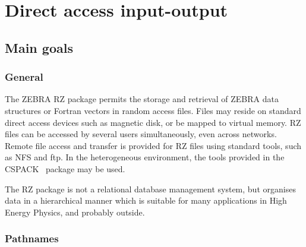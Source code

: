 

\chapter{Direct access input-output}

\section{Main goals}

\subsection{General}

The ZEBRA RZ package permits the storage and retrieval of 
ZEBRA data structures or Fortran vectors 
in random access files. Files may reside on standard
direct access devices such as magnetic disk, or be
mapped to virtual memory. 
RZ files can be accessed by several users simultaneously,
even across networks.
Remote file access and transfer is provided for RZ files
using standard tools, such as NFS and ftp. In the heterogeneous
environment, the tools provided in the CSPACK~\cite{bib-CSPACK} 
package may be used.

The RZ package is not a relational database management system,
but organises data in a hierarchical manner which is suitable
for many applications in High Energy Physics, and probably outside.

\subsection{Pathnames}

